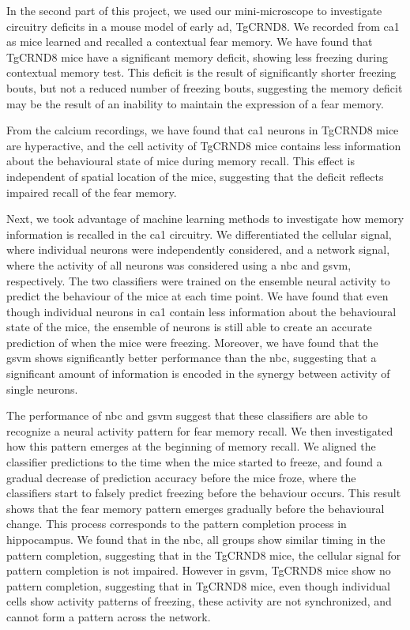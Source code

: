 In the second part of this project, we used our mini-microscope to investigate circuitry deficits in a mouse model of early \gls{ad}, TgCRND8. We recorded from \gls{ca1} as mice learned and recalled a contextual fear memory. We have found that TgCRND8 mice have a significant memory deficit, showing less freezing during contextual memory test. This deficit is the result of significantly shorter freezing bouts, but not a reduced number of freezing bouts, suggesting the memory deficit may be the result of an inability to maintain the expression of a fear memory.

From the calcium recordings, we have found that \gls{ca1} neurons in TgCRND8 mice are hyperactive, and the cell activity of TgCRND8 mice contains less information about the behavioural state of mice during memory recall.  This effect is independent of spatial location of the mice, suggesting that the deficit reflects impaired recall of the fear memory. 

Next, we took advantage of machine learning methods to investigate how memory information is recalled in the \gls{ca1} circuitry. We differentiated the cellular signal, where individual neurons were independently considered, and a network signal, where the activity of all neurons was considered using a \gls{nbc} and \gls{gsvm}, respectively. The two classifiers were trained on the ensemble neural activity to predict the behaviour of the mice at each time point. We have found that even though individual neurons in \gls{ca1} contain less information about the behavioural state of the mice, the ensemble of neurons is still able to create an accurate prediction of when the mice were freezing. Moreover, we have found that the \gls{gsvm} shows significantly better performance than the \gls{nbc}, suggesting that a significant amount of information is encoded in the synergy between activity of single neurons.

The performance of \gls{nbc} and \gls{gsvm} suggest that these classifiers are able to recognize a neural activity pattern for fear memory recall. We then investigated how this pattern emerges at the beginning of memory recall. We aligned the classifier predictions to the time when the mice started to freeze, and found a gradual decrease of prediction accuracy before the mice froze, where the classifiers start to falsely predict freezing before the behaviour occurs. This result shows that the fear memory pattern emerges gradually before the behavioural change. This process corresponds to the pattern completion process in hippocampus. We found that in the \gls{nbc}, all groups show similar timing in the pattern completion, suggesting that in the TgCRND8 mice, the cellular signal for pattern completion is not impaired. However in \gls{gsvm}, TgCRND8 mice show no pattern completion, suggesting that in TgCRND8 mice, even though individual cells show activity patterns of freezing, these activity are not synchronized, and cannot form a pattern across the network. 

